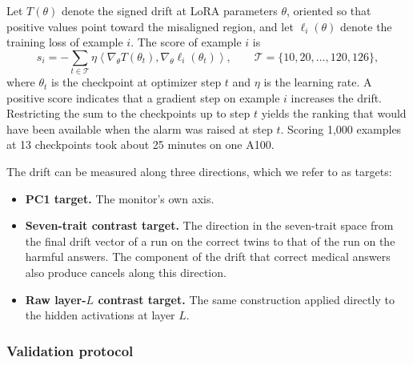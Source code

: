 \documentclass[10pt]{article}
\begin{document}
Let $T(\theta)$ denote the signed drift at LoRA parameters $\theta$, oriented so that positive
values point toward the misaligned region, and let $\ell_i(\theta)$ denote the training loss of
example $i$. The score of example $i$ is
\begin{equation}
  s_i = -\sum_{t \in \mathcal{T}} \eta \left\langle \nabla_\theta T(\theta_t),
  \nabla_\theta \ell_i(\theta_t) \right\rangle,
  \qquad \mathcal{T} = \{10, 20, \ldots, 120, 126\},
\end{equation}
where $\theta_t$ is the checkpoint at optimizer step $t$ and $\eta$ is the learning rate. A
positive score indicates that a gradient step on example $i$ increases the drift. Restricting the
sum to the checkpoints up to step $t$ yields the ranking that would have been available when the
alarm was raised at step $t$. Scoring 1,000 examples at 13 checkpoints took about 25 minutes on
one A100.

The drift can be measured along three directions, which we refer to as targets:
\begin{itemize}
  \item \textbf{PC1 target.} The monitor's own axis.
  \item \textbf{Seven-trait contrast target.} The direction in the seven-trait space from the final
  drift vector of a run on the correct twins to that of the run on the harmful answers. The
  component of the drift that correct medical answers also produce cancels along this direction.
  \item \textbf{Raw layer-$L$ contrast target.} The same construction applied directly to the
  hidden activations at layer $L$.
\end{itemize}

\subsubsection{Validation protocol}
\end{document}
